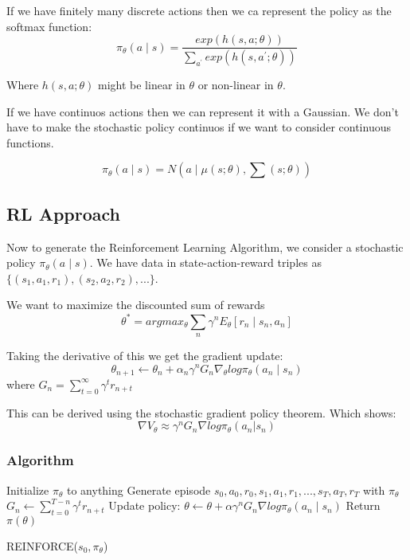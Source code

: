 \documentclass[12pt]{article}
\begin{document}
        If we have finitely many discrete actions then we ca represent the policy as the softmax function:
        $$ \pi_{\theta}(a \mid s) = \frac{exp(h(s,a; \theta))}{\sum_{a^{\prime}} exp(h(s,a^{\prime}; \theta))} $$

        Where $h(s,a;\theta)$ might be linear in $\theta$ or non-linear in $\theta$. 
        
        If we have continuos actions then we can represent it with a Gaussian. We don't have to make the stochastic
        policy continuos if we want to consider continuous functions.

        $$ \pi_{\theta}(a \mid s) = N(a \mid \mu(s;\theta), \sum(s;\theta)) $$

    \subsection{RL Approach}
        Now to generate the Reinforcement Learning Algorithm, we consider a stochastic policy $\pi_{\theta}(a \mid s)$.
        We have data in state-action-reward triples as $\{(s_1, a_1, r_1), (s_2, a_2, r_2), ... \}$.

        We want to maximize the discounted sum of rewards
        $$ \theta^* = argmax_{\theta} \sum_n \gamma^n E_{\theta}[r_n \mid s_n, a_n] $$

        Taking the derivative of this we get the gradient update:
        $$ \theta_{n+1} \gets \theta_n + \alpha_n \gamma^n G_n \nabla_{\theta} log \pi_{\theta}(a_n \mid s_n) $$
        where $G_n = \sum_{t=0}^{\infty} \gamma^t r_{n+t}$

        This can be derived using the stochastic gradient policy theorem. Which shows:
        $$ \nabla V_{\theta} \approx \gamma^n G_n \nabla log \pi_{\theta} (a_n | s_n) $$

        \subsubsection{Algorithm}
            \begin{algorithm}[H] \label{REINFORCE}
            \SetAlgoLined
            Initialize $\pi_{\theta}$ to anything \;
             {
                Generate episode $s_0, a_0, r_0, s_1, a_1, r_1, ..., s_T, a_T, r_T$ with $\pi_{\theta}$ \;
                 {
                    $G_n \gets \sum_{t=0}^{T-n} \gamma^t r_{n+t}$ \;
                    Update policy: $\theta \gets \theta + \alpha \gamma^n G_n \nabla log \pi_{\theta}(a_n \mid s_n)$ \;
                }
            }
            Return $\pi(\theta)$ \;
            \caption{REINFORCE($s_0, \pi_{\theta}$)}
        \end{algorithm}
\end{document}
